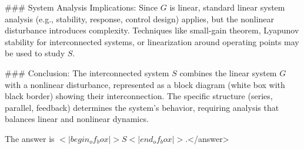 ### System Analysis Implications:  
Since \( G \) is linear, standard linear system analysis (e.g., stability, response, control design) applies, but the nonlinear disturbance introduces complexity. Techniques like small-gain theorem, Lyapunov stability for interconnected systems, or linearization around operating points may be used to study \( S \).  

### Conclusion:  
The interconnected system \( S \) combines the linear system \( G \) with a nonlinear disturbance, represented as a block diagram (white box with black border) showing their interconnection. The specific structure (series, parallel, feedback) determines the system’s behavior, requiring analysis that balances linear and nonlinear dynamics.  

The answer is \(<|begin_of_box|>S<|end_of_box|>\).</answer>